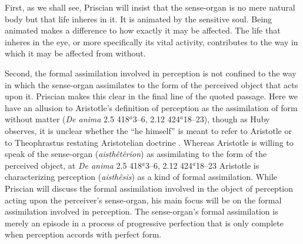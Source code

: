 \documentclass[12pt]{article}
\begin{document}
First, as we shall see, Priscian will insist that the sense-organ is no mere natural body but that life inheres in it. It is animated by the sensitive soul. Being animated makes a difference to how exactly it may be affected. The life that inheres in the eye, or more specifically its vital activity, contributes to the way in which it may be affected from without.

Second, the formal assimilation involved in perception is not confined to the way in which the sense-organ assimilates to the form of the perceived object that acts upon it. Priscian makes this clear in the final line of the quoted passage. Here we have an allusion to Aristotle's definition of perception as the assimilation of form without matter (\emph{De anima} 2.5 418\( ^{a} \)3--6, 2.12 424\( ^{a} \)18--23), though as Huby observes, it is unclear whether the ``he himself'' is meant to refer to Aristotle or to Theophrastus restating Aristotelian doctrine \citep[49--50 n11]{Sorabji:1997ly}. Whereas Aristotle is willing to speak of the sense-organ (\emph{aisthêtêrion}) as assimilating to the form of the perceived object, at \emph{De anima} 2.5 418\( ^{a} \)3--6, 2.12 424\( ^{a} \)18--23 Aristotle is characterizing perception (\emph{aisthêsis}) as a kind of formal assimilation. While Priscian will discuss the formal assimilation involved in the object of perception acting upon the perceiver's sense-organ, his main focus will be on the formal assimilation involved in perception. The sense-organ's formal assimilation is merely an episode in a process of progressive perfection that is only complete when perception accords with perfect form.
\end{document}
